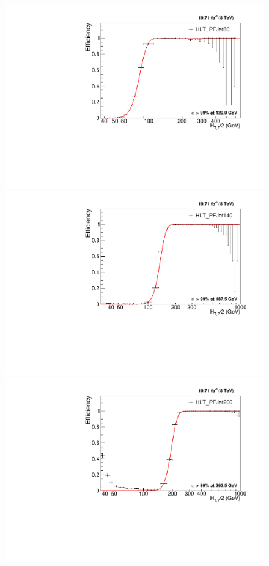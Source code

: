 \begin{figure}[!htbp]
 \begin{center}
 \includegraphics[scale=0.4]{Plots_HT_2_150/Fit_Turn_Efficiency_80_2_ht_2.pdf}%
 \includegraphics[scale=0.4]{Plots_HT_2_150/Fit_Turn_Efficiency_140_2_ht_2.pdf}\\
 \includegraphics[scale=0.4]{Plots_HT_2_150/Fit_Turn_Efficiency_200_2_ht_2.pdf}%

\end{center}
\end{figure}
